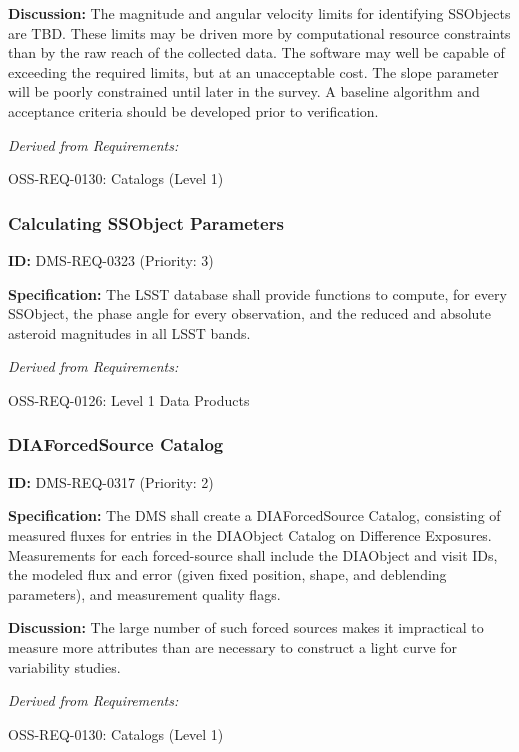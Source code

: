 \documentclass[SE,toc,lsstdraft]{lsstdoc}
\begin{document}
\textbf{Discussion: }The magnitude and angular velocity limits for identifying SSObjects are TBD. These limits may be driven more by computational resource constraints than by the raw reach of the collected data. The software may well be capable of exceeding the required limits, but at an unacceptable cost. The slope parameter will be poorly constrained until later in the survey. A baseline algorithm and acceptance criteria should be developed prior to verification.

\emph{Derived from Requirements:}

OSS-REQ-0130:
Catalogs (Level 1) \newline

\subsubsection{Calculating SSObject Parameters}

\label{DMS-REQ-0323}
\textbf{ID:} DMS-REQ-0323 (Priority: 3)

\textbf{Specification:} The LSST database shall provide functions to compute, for every SSObject, the phase angle for every observation, and the reduced and absolute asteroid magnitudes in all LSST bands.

\emph{Derived from Requirements:}

OSS-REQ-0126:
Level 1 Data Products \newline

\subsubsection{DIAForcedSource Catalog}

\label{DMS-REQ-0317}
\textbf{ID:} DMS-REQ-0317 (Priority: 2)

\textbf{Specification:} The DMS shall create a DIAForcedSource Catalog, consisting of measured fluxes for entries in the DIAObject Catalog on Difference Exposures. Measurements for each forced-source shall include the DIAObject and visit IDs, the modeled flux and error (given fixed position, shape, and deblending parameters), and measurement quality flags.

\textbf{Discussion: }The large number of such forced sources makes it impractical to measure more attributes than are necessary to construct a light curve for variability studies.

\emph{Derived from Requirements:}

OSS-REQ-0130:
Catalogs (Level 1) \newline
\end{document}
